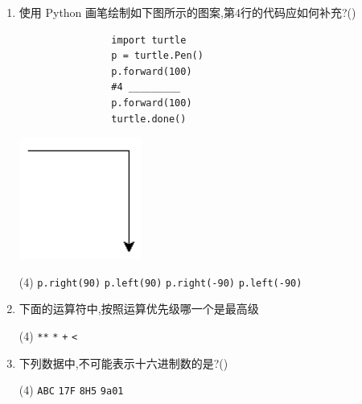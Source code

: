 \documentclass[11pt]{ctexart}
\begin{document}
\begin{enumerate}
        \item 使用 Python 画笔绘制如下图所示的图案,第4行的代码应如何补充?(\qquad)
        
        \begin{minipage}{.46\textwidth}
            \centering
            \begin{lstlisting}
                import turtle
                p = turtle.Pen()
                p.forward(100)
                #4 _________
                p.forward(100)
                turtle.done()
            \end{lstlisting}
        \end{minipage}
        \begin{minipage}{.48\textwidth}
            \centering
            \includegraphics[width=.25\textwidth]{23.png}
        \end{minipage}

        \begin{tasks}(4)
            \task \lstinline{p.right(90)}
            \task \lstinline{p.left(90)}
            \task \lstinline{p.right(-90)}
            \task \lstinline{p.left(-90)}
        \end{tasks} 

        \item 下面的运算符中,按照运算优先级哪一个是最高级
        \begin{tasks}(4)
            \task \lstinline{**}
            \task \lstinline{*}
            \task \lstinline{+}
            \task \lstinline{<}
        \end{tasks}

        \item 下列数据中,不可能表示十六进制数的是?(\qquad)
        \begin{tasks}(4)
            \task \lstinline{ABC}
            \task \lstinline{17F}
            \task \lstinline{8H5}
            \task \lstinline{9a01}
        \end{tasks}
    \end{enumerate}
\end{document}
